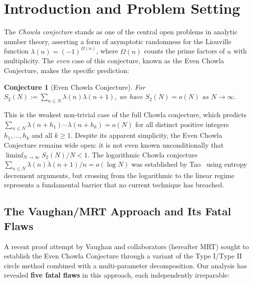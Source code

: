 \documentclass[11pt,a4paper]{article}
\theoremstyle{plain}
\newtheorem{conjecture}[theorem]{Conjecture}
\theoremstyle{definition}
\begin{document}
\tableofcontents
\newpage

\section{Introduction and Problem Setting}
\label{sec:intro}

The \emph{Chowla conjecture} stands as one of the central open problems in analytic number theory, asserting a form of asymptotic randomness for the Liouville function $\lambda(n) = (-1)^{\Omega(n)}$, where $\Omega(n)$ counts the prime factors of $n$ with multiplicity. The \emph{even} case of this conjecture, known as the Even Chowla Conjecture, makes the specific prediction:

\begin{conjecture}[Even Chowla Conjecture]
\label{conj:even-chowla}
For $S_2(N) := \sum_{n \leq N} \lambda(n)\lambda(n+1)$, we have $S_2(N) = o(N)$ as $N \to \infty$.
\end{conjecture}

This is the weakest non-trivial case of the full Chowla conjecture, which predicts $\sum_{n \leq N} \lambda(n+h_1) \cdots \lambda(n+h_k) = o(N)$ for all distinct positive integers $h_1, \ldots, h_k$ and all $k \geq 1$. Despite its apparent simplicity, the Even Chowla Conjecture remains wide open: it is not even known unconditionally that $\liminf_{N \to \infty} S_2(N)/N < 1$. The logarithmic Chowla conjecture $\sum_{n \leq N} \lambda(n)\lambda(n+1)/n = o(\log N)$ was established by Tao~\cite{tao2016logarithmic} using entropy decrement arguments, but crossing from the logarithmic to the linear regime represents a fundamental barrier that no current technique has breached.

\subsection{The Vaughan/MRT Approach and Its Fatal Flaws}
\label{subsec:vaughan-flaws}

A recent proof attempt by Vaughan and collaborators (hereafter MRT) sought to establish the Even Chowla Conjecture through a variant of the Type I/Type II circle method combined with a multi-parameter decomposition. Our analysis has revealed \textbf{five fatal flaws} in this approach, each independently irreparable:
\end{document}
